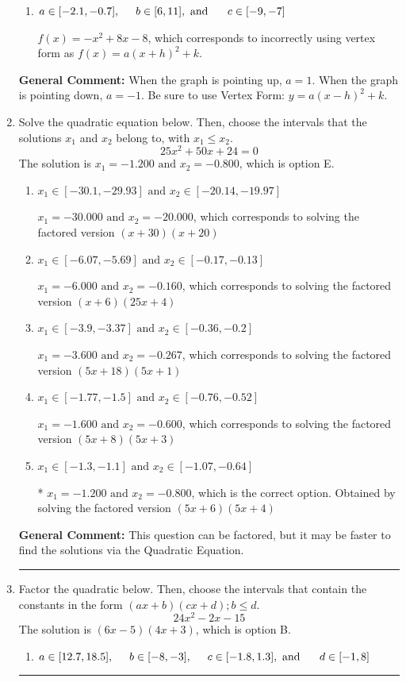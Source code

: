 \documentclass{extbook}[14pt]
\newcommand{\litem}[1]{\item #1

\rule{\textwidth}{0.4pt}}
\begin{document}
\begin{enumerate}
{\begin{enumerate}[label=\Alph*.]
$f(x)=-x^{2} +8 x -24$, which corresponds to incorrectly using vertex form as $f(x) = a(x+h)^2 - k$.
\item \( a \in [-2.1, -0.7], \hspace*{5mm} b \in [6, 11], \text{ and } \hspace*{5mm} c \in [-9, -7] \)

$f(x)=-x^{2} +8 x -8$, which corresponds to incorrectly using vertex form as $f(x) = a(x+h)^2+k$.
\end{enumerate}

\textbf{General Comment:} When the graph is pointing up, $a=1$. When the graph is pointing down, $a=-1$. Be sure to use Vertex Form: $y = a(x-h)^2+k$.
}
\litem{
Solve the quadratic equation below. Then, choose the intervals that the solutions $x_1$ and $x_2$ belong to, with $x_1 \leq x_2$.
\[ 25x^{2} +50 x + 24 = 0 \]The solution is \( x_1 = -1.200 \text{ and } x_2 = -0.800 \), which is option E.\begin{enumerate}[label=\Alph*.]
\item \( x_1 \in [-30.1, -29.93] \text{ and } x_2 \in [-20.14, -19.97] \)

$x_1 = -30.000 \text{ and } x_2 = -20.000$, which corresponds to solving the factored version $(x + 30)(x + 20)$
\item \( x_1 \in [-6.07, -5.69] \text{ and } x_2 \in [-0.17, -0.13] \)

$x_1 = -6.000 \text{ and } x_2 = -0.160$, which corresponds to solving the factored version $(x + 6)(25x + 4)$
\item \( x_1 \in [-3.9, -3.37] \text{ and } x_2 \in [-0.36, -0.2] \)

$x_1 = -3.600 \text{ and } x_2 = -0.267$, which corresponds to solving the factored version $(5x + 18)(5x + 1)$
\item \( x_1 \in [-1.77, -1.5] \text{ and } x_2 \in [-0.76, -0.52] \)

$x_1 = -1.600 \text{ and } x_2 = -0.600$, which corresponds to solving the factored version $(5x + 8)(5x + 3)$
\item \( x_1 \in [-1.3, -1.1] \text{ and } x_2 \in [-1.07, -0.64] \)

* $x_1 = -1.200 \text{ and } x_2 = -0.800$, which is the correct option. Obtained by solving the factored version $(5x + 6)(5x + 4)$
\end{enumerate}

\textbf{General Comment:} This question can be factored, but it may be faster to find the solutions via the Quadratic Equation.
}
\litem{
Factor the quadratic below. Then, choose the intervals that contain the constants in the form $(ax+b)(cx+d); b \leq d.$
\[ 24x^{2} -2 x -15 \]The solution is \( (6x -5)(4x + 3) \), which is option B.\begin{enumerate}[label=\Alph*.]
\item \( a \in [12.7, 18.5], \hspace*{5mm} b \in [-8, -3], \hspace*{5mm} c \in [-1.8, 1.3], \text{ and } \hspace*{5mm} d \in [-1, 8] \)


\end{enumerate}}
\end{enumerate}
\end{document}

